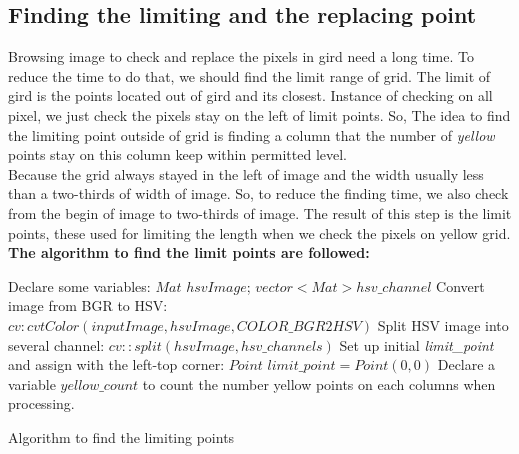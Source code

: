 \subsection{Finding the limiting and the replacing point}
Browsing image to check and replace the pixels in gird need a long time. To reduce the time to do that, we should find the limit range of grid. The limit of gird is the points located out of gird and its closest. Instance of checking on all pixel, we just check the pixels stay on the left of limit points. So, The idea to find the limiting point outside of grid is finding a column that the number of \textit{yellow} points stay on this column keep within permitted level.\\
Because the grid always stayed in the left of image and the width usually less than a two-thirds of width of image. So, to reduce the finding time, we also check from the begin of image to two-thirds of image. The result of this step is the limit points, these used for limiting the length when we check the pixels on yellow grid.\\
\textbf{The algorithm to find the limit points are followed:}\\
\begin{algorithm}[H]
\Indm
{}
\Indp
Declare some variables: $Mat$ $hsvImage$; $vector<Mat> hsv\_channel$\;
Convert image from BGR to HSV: $cv:cvtColor(inputImage, hsvImage, COLOR\_BGR2HSV)$ \;
Split HSV image into several channel: $cv::split(hsvImage, hsv\_channels)$\;
Set up initial \textit{limit\_point} and assign with the left-top corner: 
$Point$ $limit\_point = Point(0,0)$\;
Declare a variable $yellow\_count$ to count the number yellow points on each columns when processing.\;
\caption{Algorithm to find the limiting points}
\end{algorithm}~~\\
